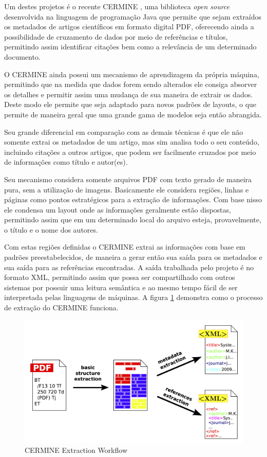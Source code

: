 \documentclass[
	12pt,               %
	openright,          %
	twoside,            %
	a4paper,            %
	english,            %
	brazil              %
	]{abntex2}
\begin{document}

Um destes projetos é o recente CERMINE \cite{cermine}, uma biblioteca \textit{open source} desenvolvida na linguagem de programação Java que permite que sejam extraídos os metadados de artigos científicos em formato digital PDF, oferecendo ainda a possibilidade de cruzamento de dados por meio de referências e títulos, permitindo assim identificar citações bem como a relevância de um determinado documento.

O CERMINE ainda possui um mecanismo de aprendizagem da própria máquina, permitindo que na medida que dados forem sendo alterados ele consiga absorver os detalhes e permitir assim uma mudança de sua maneira de extrair os dados. Deste modo ele permite que seja adaptado para novos padrões de layouts, o que permite de maneira geral que uma grande gama de modelos seja então abrangida. 

Seu grande diferencial em comparação com as demais técnicas é que ele não somente extrai os metadados de um artigo, mas sim analisa todo o seu conteúdo, incluindo citações a outros artigos, que podem ser facilmente cruzados por meio de informações como título e autor(es).

Seu mecanismo considera somente arquivos PDF com texto gerado de maneira pura, sem a utilização de imagens. Basicamente ele considera regiões, linhas e páginas como pontos estratégicos para a extração de informações. Com base nisso ele condensa um layout onde as informações geralmente estão dispostas, permitindo assim que em um determinado local do arquivo esteja, provavelmente, o título e o nome dos autores. 

Com estas regiões definidas o CERMINE extrai as informações com base em padrões preestabelecidos, de maneira a gerar então sua saída para os metadados e sua saída para as referências encontradas. A saída trabalhada pelo projeto é no formato XML, permitindo assim que possa ser compartilhado com outros sistemas por possuir uma leitura semântica e ao mesmo tempo fácil de ser interpretada pelas linguagens de máquinas. A figura \ref{fig:cermine-workflow} demonstra como o processo de extração do CERMINE funciona.

\begin{figure}
\centering
\caption{CERMINE Extraction Workflow}
\label{fig:cermine-workflow}
\includegraphics[width=0.7\linewidth]{./assets/cermine}
\end{figure}
\end{document}
